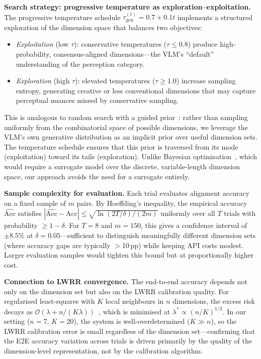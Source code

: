 \documentclass[runningheads]{llncs}
\begin{document}
\smallskip\noindent\textbf{Search strategy: progressive temperature as exploration--exploitation.}
The progressive temperature schedule $\tau_{\mathrm{gen}}^{(t)} = 0.7 + 0.1t$ implements a structured exploration of the dimension space that balances two objectives:
\begin{itemize}
    \item \emph{Exploitation} (low $\tau$): conservative temperatures ($\tau \leq 0.8$) produce high-probability, consensus-aligned dimensions---the VLM's ``default'' understanding of the perception category.
    \item \emph{Exploration} (high $\tau$): elevated temperatures ($\tau \geq 1.0$) increase sampling entropy, generating creative or less conventional dimensions that may capture perceptual nuances missed by conservative sampling.
\end{itemize}
This is analogous to random search with a guided prior~\cite{bergstra2012random}: rather than sampling uniformly from the combinatorial space of possible dimensions, we leverage the VLM's own generative distribution as an implicit prior over useful dimension sets.
The temperature schedule ensures that this prior is traversed from its mode (exploitation) toward its tails (exploration).
Unlike Bayesian optimisation~\cite{snoek2012practical}, which would require a surrogate model over the discrete, variable-length dimension space, our approach avoids the need for a surrogate entirely.

\smallskip\noindent\textbf{Sample complexity for evaluation.}
Each trial evaluates alignment accuracy on a fixed sample of $m$ pairs.
By Hoeffding's inequality, the empirical accuracy $\widehat{\mathrm{Acc}}$ satisfies $|\widehat{\mathrm{Acc}} - \mathrm{Acc}| \leq \sqrt{\ln(2T/\delta)/(2m)}$ uniformly over all $T$ trials with probability $\geq 1-\delta$.
For $T{=}8$ and $m{=}150$, this gives a confidence interval of $\pm 8.5$\% at $\delta{=}0.05$---sufficient to distinguish meaningfully different dimension sets (where accuracy gaps are typically $>$10\,pp) while keeping API costs modest.
Larger evaluation samples would tighten this bound but at proportionally higher cost.

\smallskip\noindent\textbf{Connection to LWRR convergence.}
The end-to-end accuracy depends not only on the dimension set but also on the LWRR calibration quality.
For regularised least-squares with $K$ local neighbours in $n$ dimensions, the excess risk decays as $\mathcal{O}(\lambda + n/(K\lambda))$~\cite{caponnetto2007optimal,hoerl1970ridge}, which is minimised at $\lambda^* \propto (n/K)^{1/2}$.
In our setting ($n{=}7$, $K{=}20$), the system is well-overdetermined ($K \gg n$), so the LWRR calibration error is small regardless of the dimension set---confirming that the E2E accuracy variation across trials is driven primarily by the quality of the dimension-level representation, not by the calibration algorithm.
\end{document}

